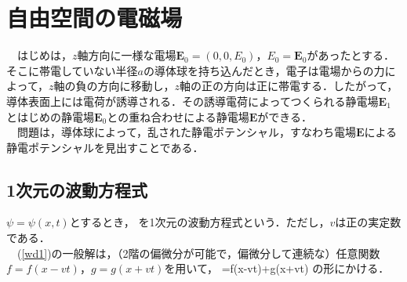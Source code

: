 
\section{自由空間の電磁場}
　はじめは，$z$軸方向に一様な電場$\bm E_0=(0,0,E_0)$，$E_0=\bm E_0$があったとする．そこに帯電していない半径$a$の導体球を持ち込んだとき，電子は電場からの力によって，$z$軸の負の方向に移動し，$z$軸の正の方向は正に帯電する．したがって，導体表面上には電荷が誘導される．その誘導電荷によってつくられる静電場$\bm E_1$とはじめの静電場$\bm E_0$との重ね合わせによる静電場$\bm E$ができる．\\
　問題は，導体球によって，乱された静電ポテンシャル，すなわち電場$\bm E$による静電ポテンシャルを見出すことである．
\subsection{1次元の波動方程式}
$\psi=\psi(x,t)$とするとき，
\be\label{wd1}
\ee
を1次元の波動方程式という．ただし，$v$は正の実定数である．\\
　(\ref{wd1})の一般解は，（2階の偏微分が可能で，偏微分して連続な）任意関数$f=f(x-vt)$，$g=g(x+vt)$を用いて，
\be
\psi=f(x-vt)+g(x+vt)
\ee
の形にかける．


















